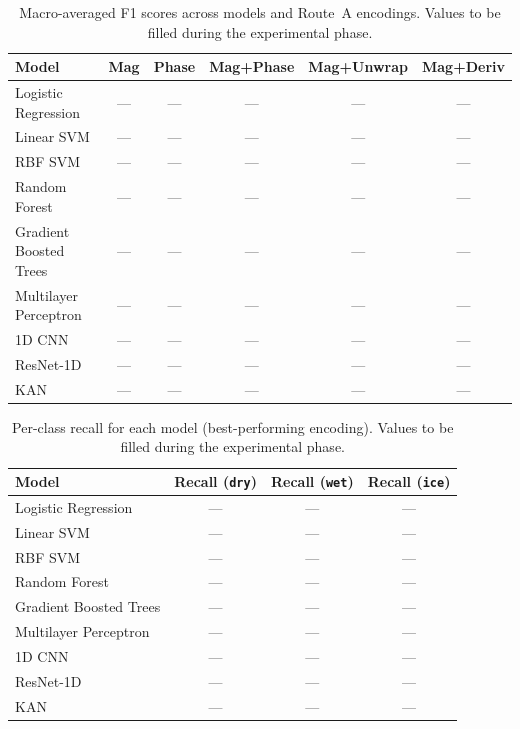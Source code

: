 \begin{table}[htbp]
  \centering
  \caption{Macro-averaged F1 scores across models and Route~A encodings.
           Values to be filled during the experimental phase.}
  \label{tab:macro_f1_results}
  \begin{tabular}{l c c c c c}
    \toprule
    \textbf{Model}
      & \textbf{Mag}
      & \textbf{Phase}
      & \textbf{Mag+Phase}
      & \textbf{Mag+Unwrap}
      & \textbf{Mag+Deriv} \\
    \midrule
    Logistic Regression   & --- & --- & --- & --- & --- \\
    Linear SVM            & --- & --- & --- & --- & --- \\
    RBF SVM               & --- & --- & --- & --- & --- \\
    Random Forest         & --- & --- & --- & --- & --- \\
    Gradient Boosted Trees & --- & --- & --- & --- & --- \\
    Multilayer Perceptron & --- & --- & --- & --- & --- \\
    1D CNN                & --- & --- & --- & --- & --- \\
    ResNet-1D             & --- & --- & --- & --- & --- \\
    KAN                   & --- & --- & --- & --- & --- \\
    \bottomrule
  \end{tabular}
\end{table}

\begin{table}[htbp]
  \centering
  \caption{Per-class recall for each model (best-performing encoding).
           Values to be filled during the experimental phase.}
  \label{tab:perclass_recall}
  \begin{tabular}{l c c c}
    \toprule
    \textbf{Model}
      & \textbf{Recall (\texttt{dry})}
      & \textbf{Recall (\texttt{wet})}
      & \textbf{Recall (\texttt{ice})} \\
    \midrule
    Logistic Regression    & --- & --- & --- \\
    Linear SVM             & --- & --- & --- \\
    RBF SVM                & --- & --- & --- \\
    Random Forest          & --- & --- & --- \\
    Gradient Boosted Trees & --- & --- & --- \\
    Multilayer Perceptron  & --- & --- & --- \\
    1D CNN                 & --- & --- & --- \\
    ResNet-1D              & --- & --- & --- \\
    KAN                    & --- & --- & --- \\
    \bottomrule
  \end{tabular}
\end{table}

